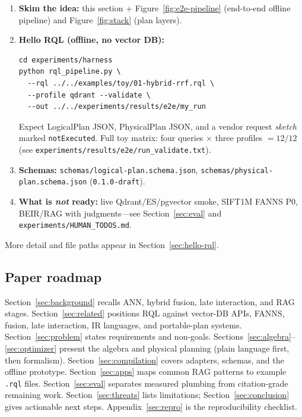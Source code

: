 \begin{enumerate}[leftmargin=*]
  \item \textbf{Skim the idea:} this section + Figure~\ref{fig:e2e-pipeline} (end-to-end offline pipeline) and Figure~\ref{fig:stack} (plan layers).
  \item \textbf{Hello RQL (offline, no vector DB):}
  \begin{verbatim}
cd experiments/harness
python rql_pipeline.py \
  --rql ../../examples/toy/01-hybrid-rrf.rql \
  --profile qdrant --validate \
  --out ../../experiments/results/e2e/my_run
  \end{verbatim}
  Expect LogicalPlan JSON, PhysicalPlan JSON, and a vendor request \emph{sketch} marked \texttt{notExecuted}.
  Full toy matrix: four queries $\times$ three profiles $= 12/12$ (see \texttt{experiments/results/e2e/run\_validate.txt}).
  \item \textbf{Schemas:} \texttt{schemas/logical-plan.schema.json}, \texttt{schemas/physical-plan.schema.json} (\texttt{0.1.0-draft}).
  \item \textbf{What is \emph{not} ready:} live Qdrant/ES/pgvector smoke, SIFT1M FANNS P0, BEIR/RAG with judgments---see Section~\ref{sec:eval} and \texttt{experiments/HUMAN\_TODOS.md}.
\end{enumerate}
More detail and file paths appear in Section~\ref{sec:hello-rql}.

\subsection{Paper roadmap}
Section~\ref{sec:background} recalls ANN, hybrid fusion, late interaction, and RAG stages.
Section~\ref{sec:related} positions RQL against vector-DB APIs, FANNS, fusion, late interaction, IR languages, and portable-plan systems.
Section~\ref{sec:problem} states requirements and non-goals.
Sections~\ref{sec:algebra}--\ref{sec:optimizer} present the algebra and physical planning (plain language first, then formalism).
Section~\ref{sec:compilation} covers adapters, schemas, and the offline prototype.
Section~\ref{sec:apps} maps common RAG patterns to example \texttt{.rql} files.
Section~\ref{sec:eval} separates measured plumbing from citation-grade remaining work.
Section~\ref{sec:threats} lists limitations; Section~\ref{sec:conclusion} gives actionable next steps.
Appendix~\ref{sec:repro} is the reproducibility checklist.
